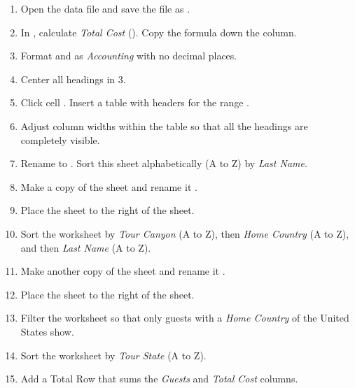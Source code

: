 \begin{enumbox}
	\begin{enumerate}
		\item Open the data file  and save the file as .
		\item In , calculate \textit{Total Cost} (). Copy the formula down the column.
		\item Format  and  as \textit{Accounting} with no decimal places.
		\item Center all headings in $ 3 $.
		\item Click cell . Insert a table with headers for the range .
		\item Adjust column widths within the table so that all the headings are completely visible.
		\item Rename  to . Sort this sheet alphabetically (A to Z) by \textit{Last Name}.
	
		\item Make a copy of the  sheet and rename it .
		\item Place the  sheet to the right of the  sheet.
		\item Sort the  worksheet by \textit{Tour Canyon} (A to Z), then \textit{Home Country} (A to Z), and then \textit{Last Name} (A to Z).
	
		\item Make another copy of the  sheet and rename it .
		\item Place the  sheet to the right of the  sheet.
		\item Filter the  worksheet so that only guests with a \textit{Home Country} of the United States show. 
		\item Sort the worksheet by \textit{Tour State} (A to Z).
		\item Add a Total Row that sums the \textit{Guests} and \textit{Total Cost} columns.
	

\end{enumerate}
\end{enumbox}
